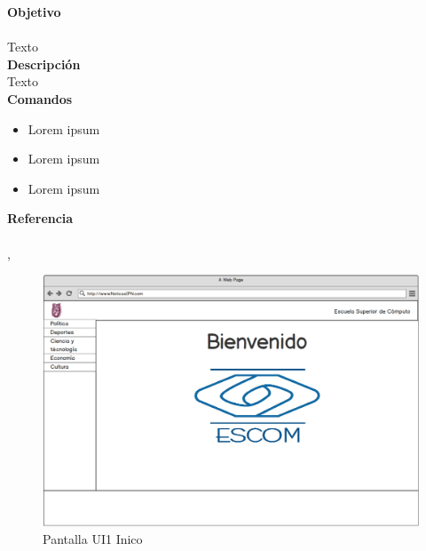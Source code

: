 
\Large{\textbf{Objetivo}}\\\\
\normalsize{Texto}\\

	

\Large{\textbf{Descripción}}\\
\normalsize{Texto}\\

\Large{\textbf{Comandos}}\\
\normalsize{}

\begin{itemize}
	\item Lorem ipsum
	\item Lorem ipsum
	\item Lorem ipsum
\end{itemize}


\Large{\textbf{Referencia}}\\\\
\normalsize{,}

\begin{figure}[H]
  \centering
	\includegraphics[scale=.35]{imagenes/Pantallas/UI1}
  \caption{Pantalla UI1 Inico}
  \label{fig:UI1}
\end{figure}



